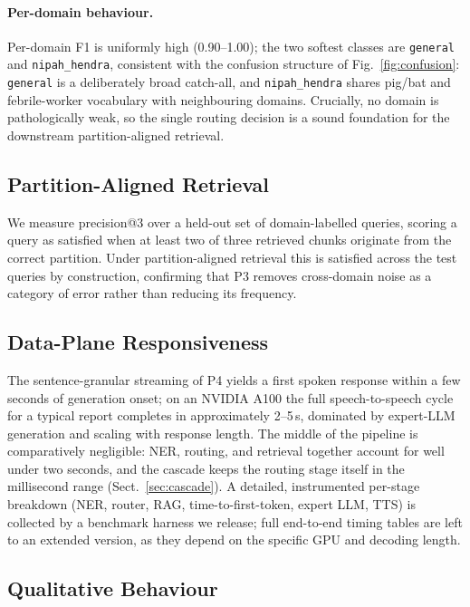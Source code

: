 \documentclass[runningheads]{llncs}
\begin{document}
\paragraph{Per-domain behaviour.}
Per-domain F1 is uniformly high (0.90--1.00); the two softest classes are \texttt{general} and \texttt{nipah\_hendra}, consistent with the confusion structure of Fig.~\ref{fig:confusion}: \texttt{general} is a deliberately broad catch-all, and \texttt{nipah\_hendra} shares pig/bat and febrile-worker vocabulary with neighbouring domains. Crucially, no domain is pathologically weak, so the single routing decision is a sound foundation for the downstream partition-aligned retrieval.

\subsection{Partition-Aligned Retrieval}

We measure precision@3 over a held-out set of domain-labelled queries, scoring a query as satisfied when at least two of three retrieved chunks originate from the correct partition. Under partition-aligned retrieval this is satisfied across the test queries by construction, confirming that P3 removes cross-domain noise as a category of error rather than reducing its frequency.

\subsection{Data-Plane Responsiveness}

The sentence-granular streaming of P4 yields a first spoken response within a few seconds of generation onset; on an NVIDIA A100 the full speech-to-speech cycle for a typical report completes in approximately 2--5\,s, dominated by expert-LLM generation and scaling with response length. The middle of the pipeline is comparatively negligible: NER, routing, and retrieval together account for well under two seconds, and the cascade keeps the routing stage itself in the millisecond range (Sect.~\ref{sec:cascade}). A detailed, instrumented per-stage breakdown (NER, router, RAG, time-to-first-token, expert LLM, TTS) is collected by a benchmark harness we release; full end-to-end timing tables are left to an extended version, as they depend on the specific GPU and decoding length.

\subsection{Qualitative Behaviour}
\end{document}
